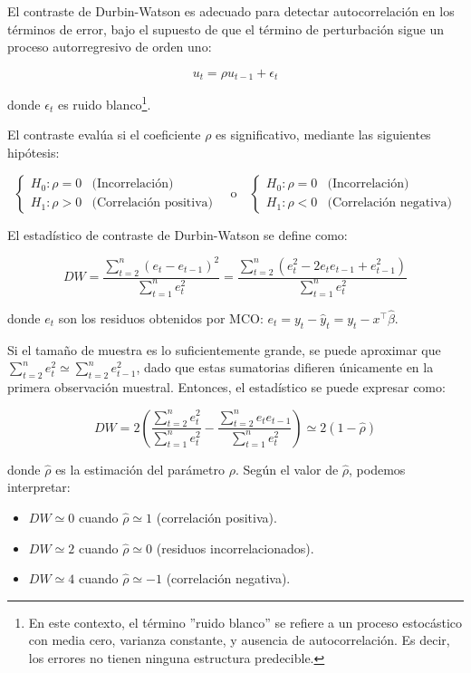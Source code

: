 \documentclass[a4paper,12pt]{article}
\begin{document}
El contraste de Durbin-Watson es adecuado para detectar autocorrelación en los términos de error, bajo el supuesto de que el término de perturbación sigue un proceso autorregresivo de orden uno:

\[
u_t = \rho u_{t-1} + \epsilon_t
\]

donde $\epsilon_t$ es ruido blanco\footnote{En este contexto, el término ''ruido blanco'' se refiere a un proceso estocástico con media cero, varianza constante, y ausencia de autocorrelación. Es decir, los errores no tienen ninguna estructura predecible.}. 

El contraste evalúa si el coeficiente $\rho$ es significativo, mediante las siguientes hipótesis:

\[
\begin{cases}
H_0 : \rho = 0 & \text{(Incorrelación)} \\
H_1 : \rho > 0 & \text{(Correlación positiva)}
\end{cases}
\quad \text{o} \quad
\begin{cases}
H_0 : \rho = 0 & \text{(Incorrelación)} \\
H_1 : \rho < 0 & \text{(Correlación negativa)}
\end{cases}
\]

El estadístico de contraste de Durbin-Watson se define como:

\[
DW = \frac{\sum_{t=2}^n (e_t - e_{t-1})^2}{\sum_{t=1}^n e_t^2} = \frac{\sum_{t=2}^n (e_t^2 - 2 e_t e_{t-1} + e_{t-1}^2)}{\sum_{t=1}^n e_t^2}
\]

donde $e_t$ son los residuos obtenidos por MCO: $e_t = y_t - \hat{y}_t = y_t - x^\top \hat{\beta}$.

Si el tamaño de muestra es lo suficientemente grande, se puede aproximar que $\sum_{t=2}^n e_t^2 \simeq \sum_{t=2}^n e_{t-1}^2$, dado que estas sumatorias difieren únicamente en la primera observación muestral. Entonces, el estadístico se puede expresar como:

\[
DW = 2 \left( \frac{\sum_{t=2}^n e_t^2}{\sum_{t=1}^n e_t^2} - \frac{\sum_{t=2}^n e_t e_{t-1}}{\sum_{t=1}^n e_t^2} \right) \simeq 2(1 - \hat{\rho})
\]

donde $\hat{\rho}$ es la estimación del parámetro $\rho$. Según el valor de $\hat{\rho}$, podemos interpretar:

\begin{itemize}
    \item $DW \simeq 0$ cuando $\hat{\rho} \simeq 1$ (correlación positiva).
    \item $DW \simeq 2$ cuando $\hat{\rho} \simeq 0$ (residuos incorrelacionados).
    \item $DW \simeq 4$ cuando $\hat{\rho} \simeq -1$ (correlación negativa).
\end{itemize}
\end{document}
